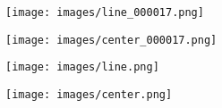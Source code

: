 \documentclass[10pt,twocolumn,letterpaper]{article}
\begin{document}
\begin{figure}[h]
\begin{center}
    \begin{subfigure}[b]{0.235\textwidth}
                \texttt{[image: images/line\_000017.png]}
    \end{subfigure}%
        \begin{subfigure}[b]{0.235\textwidth}
                \texttt{[image: images/center\_000017.png]}
    \end{subfigure}%

    \begin{subfigure}[b]{0.235\textwidth}
                \texttt{[image: images/line.png]}
    \end{subfigure}%
    \begin{subfigure}[b]{0.235\textwidth}
                \texttt{[image: images/center.png]}
    \end{subfigure}%


\end{center}
\end{figure}
\end{document}
